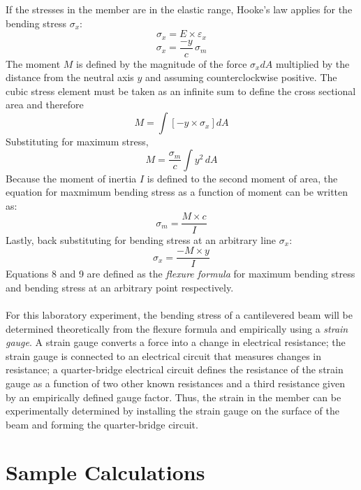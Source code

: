 \documentclass{article}
\begin{document}
    If the stresses in the member are in the elastic range, Hooke's law applies for the bending stress $\sigma_x$:
    \[\sigma_x = E\times\varepsilon_x\]
    \[\sigma_x = \frac{-y}{c}\,\sigma_m\]
    The moment $M$ is defined by the magnitude of the force $\sigma_x dA$ multiplied by the distance from the neutral axis $y$ and assuming counterclockwise positive. The cubic stress element must be taken as an infinite sum to define the cross sectional area and therefore 
    \begin{equation*}
        M = \int\left[-y\times\sigma_x\right]dA
    \end{equation*}
    Substituting for maximum stress,
    \begin{equation*}
    M = \frac{\sigma_m}{c} \int y^2\,dA 
    \end{equation*}
    Because the moment of inertia $I$ is defined to the second moment of area, the equation for maxmimum bending stress as a function of moment can be written as:
    \begin{equation*}
        \sigma_m = \frac{M\times c}{I}
    \end{equation*}
    Lastly, back substituting for bending stress at an arbitrary line $\sigma_x$:
    \begin{equation*}
        \sigma_x = \frac{-M\times y}{I}
    \end{equation*}
    Equations 8 and 9 are defined as the \emph{flexure formula} for maximum bending stress and bending stress at an arbitrary point respectively.
    \\\\
    For this laboratory experiment, the bending stress of a cantilevered beam will be determined theoretically from the flexure formula and empirically using a \emph{strain gauge}. A strain gauge converts a force into a change in electrical resistance; the strain gauge is connected to an electrical circuit that measures changes in resistance; a quarter-bridge electrical circuit defines the resistance of the strain gauge as a function of two other known resistances and a third resistance given by an empirically defined gauge factor. Thus, the strain in the member can be experimentally determined by installing the strain gauge on the surface of the beam and forming the quarter-bridge circuit. 

    \newpage
    \section{Sample Calculations}
    \singlespacing
\end{document}
